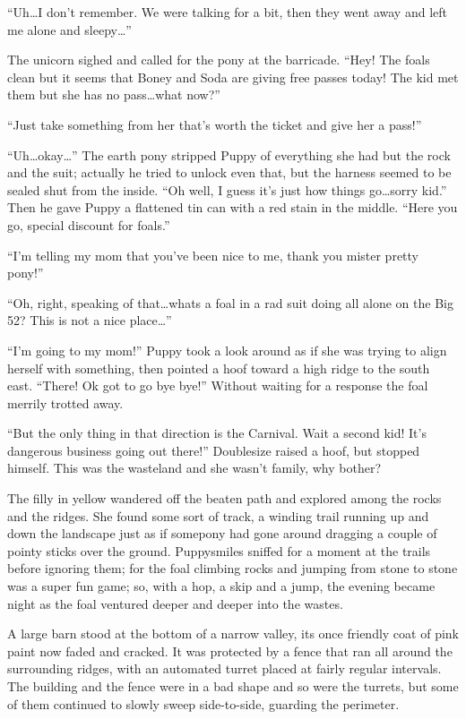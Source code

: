 ``Uh\dots I don't remember. We were talking for a bit, then they went away and left me alone and sleepy\dots''

The unicorn sighed and called for the pony at the barricade. ``Hey! The foals clean but it seems that Boney and Soda are giving free passes today! The kid met them but she has no pass\dots what now?''

``Just take something from her that's worth the ticket and give her a pass!''

``Uh\dots okay\dots'' The earth pony stripped Puppy of everything she had but the rock and the suit; actually he tried to unlock even that, but the harness seemed to be sealed shut from the inside. ``Oh well, I guess it's just how things go\dots sorry kid.'' Then he gave Puppy a flattened tin can with a red stain in the middle. ``Here you go, special discount for foals.''

``I'm telling my mom that you've been nice to me, thank you mister pretty pony!''

``Oh, right, speaking of that\dots whats a foal in a rad suit doing all alone on the Big 52? This is not a nice place\dots''

``I'm going to my mom!'' Puppy took a look around as if she was trying to align herself with something, then pointed a hoof toward a high ridge to the south east. ``There! Ok got to go bye bye!'' Without waiting for a response the foal merrily trotted away.

``But the only thing in that direction is the Carnival. Wait a second kid! It's dangerous business going out there!'' Doublesize raised a hoof, but stopped himself. This was the wasteland and she wasn't family, why bother?

The filly in yellow wandered off the beaten path and explored among the rocks and the ridges. She found some sort of track, a winding trail running up and down the landscape just as if somepony had gone around dragging a couple of pointy sticks over the ground. Puppysmiles sniffed for a moment at the trails before ignoring them; for the foal climbing rocks and jumping from stone to stone was a super fun game; so, with a hop, a skip and a jump, the evening became night as the foal ventured deeper and deeper into the wastes.

\horizonline


A large barn stood at the bottom of a narrow valley, its once friendly coat of pink paint now faded and cracked. It was protected by a fence that ran all around the surrounding ridges, with an automated turret placed at fairly regular intervals. The building and the fence were in a bad shape and so were the turrets, but some of them continued to slowly sweep side-to-side, guarding the perimeter.

